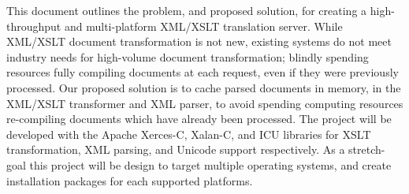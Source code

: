 %
%
% 
This document outlines the problem, and proposed solution, for creating a high-throughput and multi-platform XML/XSLT translation server. 
While XML/XSLT document transformation is not new, existing systems do not meet industry needs for high-volume document transformation; blindly spending resources fully compiling documents at each request, even if they were previously processed.
Our proposed solution is to cache parsed documents in memory, in the XML/XSLT transformer and XML parser, to avoid spending computing resources re-compiling documents which have already been processed.
The project will be developed with the Apache Xerces-C, Xalan-C, and ICU libraries for XSLT transformation, XML parsing, and Unicode support respectively.
As a stretch-goal this project will be design to target multiple operating systems, and create installation packages for each supported platforms.
